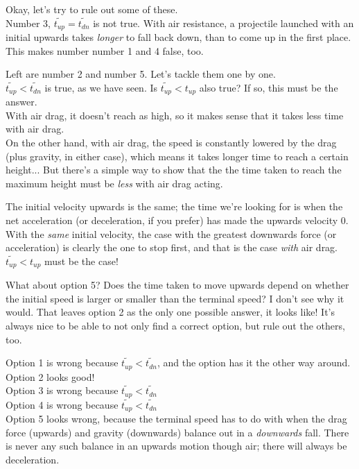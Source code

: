 \documentclass[8.01x]{subfiles}
\begin{document}
Okay, let's try to rule out some of these.\\
Number 3, $\widetilde{t_{up}} = \widetilde{t_{dn}}$ is not true. With air resistance, a projectile launched with an initial upwards takes \emph{longer} to fall back down, than to come up in the first place. This makes number number 1 and 4 false, too.

Left are number 2 and number 5. Let's tackle them one by one.\\
$\widetilde{t_{up}} < \widetilde{t_{dn}}$ is true, as we have seen. Is $\widetilde{t_{up}} < t_{up}$ also true? If so, this must be the answer.\\
With air drag, it doesn't reach as high, so it makes sense that it takes less time with air drag.\\
On the other hand, with air drag, the speed is constantly lowered by the drag (plus gravity, in either case), which means it takes longer time to reach a certain height... But there's a simple way to show that the the time taken to reach the maximum height must be \emph{less} with air drag acting.

The initial velocity upwards is the same; the time we're looking for is when the net acceleration (or deceleration, if you prefer) has made the upwards velocity 0. With the \emph{same} initial velocity, the case with the greatest downwards force (or acceleration) is clearly the one to stop first, and that is the case \emph{with} air drag. $\widetilde{t_{up}} < t_{up}$ must be the case!

What about option 5? Does the time taken to move upwards depend on whether the initial speed is larger or smaller than the terminal speed? I don't see why it would. That leaves option 2 as the only one possible answer, it looks like! It's always nice to be able to not only find a correct option, but rule out the others, too.

Option 1 is wrong because $\widetilde{t_{up}} < \widetilde{t_{dn}}$, and the option has it the other way around.\\
Option 2 looks good!\\
Option 3 is wrong because $\widetilde{t_{up}} < \widetilde{t_{dn}}$\\
Option 4 is wrong because $\widetilde{t_{up}} < \widetilde{t_{dn}}$\\
Option 5 looks wrong, because the terminal speed has to do with when the drag force (upwards) and gravity (downwards) balance out in a \emph{downwards} fall. There is never any such balance in an upwards motion though air; there will always be deceleration.
\end{document}
